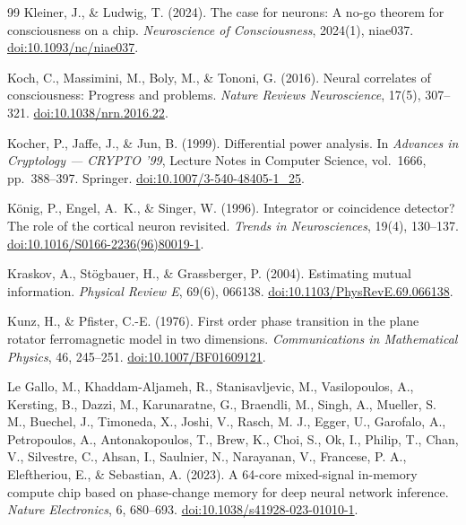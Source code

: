 \begin{thebibliography}{99}
 Kleiner, J., \& Ludwig, T. (2024). The case for neurons: A no-go theorem for consciousness on a chip. \textit{Neuroscience of Consciousness}, 2024(1), niae037. \href{https://doi.org/10.1093/nc/niae037}{doi:10.1093/nc/niae037}.

 Koch, C., Massimini, M., Boly, M., \& Tononi, G. (2016). Neural correlates of consciousness: Progress and problems. \textit{Nature Reviews Neuroscience}, 17(5), 307--321. \href{https://doi.org/10.1038/nrn.2016.22}{doi:10.1038/nrn.2016.22}.

 Kocher, P., Jaffe, J., \& Jun, B. (1999). Differential power analysis. In \textit{Advances in Cryptology --- CRYPTO '99}, Lecture Notes in Computer Science, vol.~1666, pp.~388--397. Springer. \href{https://doi.org/10.1007/3-540-48405-1_25}{doi:10.1007/3-540-48405-1\_25}.

 K\"{o}nig, P., Engel, A.~K., \& Singer, W. (1996). Integrator or coincidence detector? The role of the cortical neuron revisited. \textit{Trends in Neurosciences}, 19(4), 130--137. \href{https://doi.org/10.1016/S0166-2236(96)80019-1}{doi:10.1016/S0166-2236(96)80019-1}.

 Kraskov, A., St\"{o}gbauer, H., \& Grassberger, P. (2004). Estimating mutual information. \textit{Physical Review E}, 69(6), 066138. \href{https://doi.org/10.1103/PhysRevE.69.066138}{doi:10.1103/PhysRevE.69.066138}.

 Kunz, H., \& Pfister, C.-E. (1976). First order phase transition in the plane rotator ferromagnetic model in two dimensions. \textit{Communications in Mathematical Physics}, 46, 245--251. \href{https://doi.org/10.1007/BF01609121}{doi:10.1007/BF01609121}.

 Le Gallo, M., Khaddam-Aljameh, R., Stanisavljevic, M., Vasilopoulos, A., Kersting, B., Dazzi, M., Karunaratne, G., Braendli, M., Singh, A., Mueller, S. M., Buechel, J., Timoneda, X., Joshi, V., Rasch, M. J., Egger, U., Garofalo, A., Petropoulos, A., Antonakopoulos, T., Brew, K., Choi, S., Ok, I., Philip, T., Chan, V., Silvestre, C., Ahsan, I., Saulnier, N., Narayanan, V., Francese, P. A., Eleftheriou, E., \& Sebastian, A. (2023). A 64-core mixed-signal in-memory compute chip based on phase-change memory for deep neural network inference. \textit{Nature Electronics}, 6, 680--693. \href{https://doi.org/10.1038/s41928-023-01010-1}{doi:10.1038/s41928-023-01010-1}.


\end{thebibliography}
